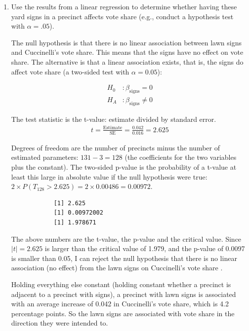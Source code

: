 \documentclass[12pt,letterpaper]{article}
\begin{document}
	\vspace{.5cm}
	\begin{enumerate}
		\item [(a)] Use the results from a linear regression to determine whether having these yard signs in a precinct affects vote share (e.g., conduct a hypothesis test with $\alpha = .05$).
		\vspace{.25cm}
	
		\noindent The null hypothesis is that there is no linear association between lawn signs and Cuccinelli's vote share. This means that the signs have no effect on vote share. The alternative is that a linear association exists, that is, the signs do affect vote share (a two-sided test with $\alpha = 0.05$):
		
	\begin{align*}
		H_0&: \beta_{\text{signs}} = 0 \\
		H_A&: \beta_{\text{signs}} \neq 0
	\end{align*}
		
		\noindent The test statistic is the t-value: estimate divided by standard error. 
		\begin{align*}
			t = \frac{\text{Estimate}}{\text{SE}} = \frac{0.042}{0.016} = 2.625
		\end{align*}
	
		Degrees of freedom are the number of precincts minus the number of estimated parameters: $131 - 3 = 128$ (the coefficients for the two variables plus the constant). The two-sided p-value is the probability of a t-value at least this large in absolute value if the null hypothesis were true: $2 \times P(T_{128} > 2.625) = 2 \times 0.00486 = 0.00972$. 
		
		
		\begin{verbatim}
			[1] 2.625
			[1] 0.00972002
			[1] 1.978671
		\end{verbatim}
		\noindent The above numbers are the t-value, the p-value and the critical value. Since $|t| = 2.625$ is larger than the critical value of 1.979, and the p-value of 0.0097 is smaller than 0.05, I can reject the null hypothesis that there is no linear association (no effect) from the lawn signs on Cuccinelli's vote share .
		\vspace{.25cm}
	
		\noindent Holding everything else constant (holding constant whether a precinct is adjacent to a precinct with signs), a precinct with lawn signs is associated with an average increase of 0.042 in Cuccinelli's vote share, which is 4.2 percentage points. So the lawn signs are associated with vote share in the direction they were intended to.
		

\end{enumerate}
\end{document}

